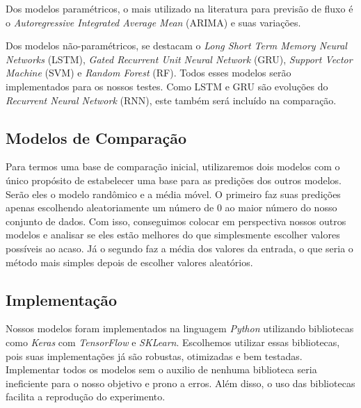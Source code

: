 
Dos modelos paramétricos, o mais utilizado na literatura para previsão de fluxo é o \textit{Autoregressive Integrated Average Mean} (ARIMA) e suas variações. %

Dos modelos não-paramétricos, se destacam o \textit{Long Short Term Memory Neural Networks} (LSTM), \textit{Gated Recurrent Unit Neural Network} (GRU), \textit{Support Vector Machine} (SVM) e \textit{Random Forest} (RF). Todos esses modelos serão implementados para os nossos testes. Como LSTM e GRU são evoluções do \textit{Recurrent Neural Network} (RNN), este também será incluído na comparação. 

\subsection{Modelos de Comparação}

Para termos uma base de comparação inicial, utilizaremos dois modelos com o único propósito de estabelecer uma base para as predições dos outros modelos. Serão eles o modelo randômico e a média móvel. O primeiro faz suas predições apenas escolhendo aleatoriamente um número de 0 ao maior número do nosso conjunto de dados. Com isso, conseguimos colocar em perspectiva nossos outros modelos e analisar se eles estão melhores do que simplesmente escolher valores possíveis ao acaso. Já o segundo faz a média dos valores da entrada, o que seria o método mais simples depois de escolher valores aleatórios.
\subsection{Implementação}


Nossos modelos foram implementados na linguagem \textit{Python} utilizando bibliotecas como \textit{Keras} com \textit{TensorFlow} e \textit{SKLearn}. Escolhemos utilizar essas bibliotecas, pois suas implementações já são robustas, otimizadas e bem testadas. Implementar todos os modelos sem o auxilio de nenhuma biblioteca seria ineficiente para o nosso objetivo e prono a erros. Além disso, o uso das bibliotecas facilita a reprodução do experimento.

